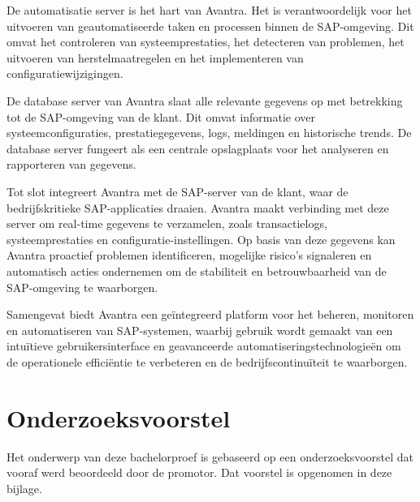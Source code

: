 \documentclass[dutch,dit,thesis]{hogentreport}
\begin{document}
De automatisatie server is het hart van Avantra. Het is verantwoordelijk voor het uitvoeren van geautomatiseerde taken en processen binnen de SAP-omgeving. Dit omvat het controleren van systeemprestaties, het detecteren
 van problemen, het uitvoeren van herstelmaatregelen en het implementeren van configuratiewijzigingen.

De database server van Avantra slaat alle relevante gegevens op met betrekking tot de SAP-omgeving van de klant. Dit omvat informatie over systeemconfiguraties, prestatiegegevens, logs, meldingen en historische
 trends. De database server fungeert als een centrale opslagplaats voor het analyseren en rapporteren van gegevens.

Tot slot integreert Avantra met de SAP-server van de klant, waar de bedrijfskritieke SAP-applicaties draaien. Avantra maakt verbinding met deze server om real-time gegevens te verzamelen, zoals transactielogs, systeemprestaties
 en configuratie-instellingen. Op basis van deze gegevens kan Avantra proactief problemen identificeren, mogelijke risico's signaleren en automatisch acties ondernemen om de stabiliteit en betrouwbaarheid van de SAP-omgeving te waarborgen.

Samengevat biedt Avantra een geïntegreerd platform voor het beheren, monitoren en automatiseren van SAP-systemen, waarbij gebruik wordt gemaakt van een intuïtieve gebruikersinterface en geavanceerde 
automatiseringstechnologieën om de operationele efficiëntie te verbeteren en de bedrijfscontinuïteit te waarborgen.




%
%

%


\appendix

\chapter{Onderzoeksvoorstel}

Het onderwerp van deze bachelorproef is gebaseerd op een onderzoeksvoorstel dat vooraf werd beoordeeld door de promotor. Dat voorstel is opgenomen in deze bijlage.

\end{document}
